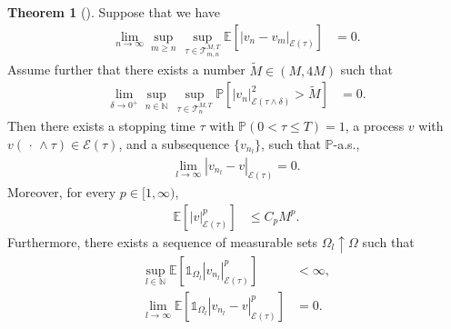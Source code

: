 \documentclass[11pt, reqno]{amsart}
\theoremstyle{definition}
\newtheorem{theorem}{Theorem}[section]
\numberwithin{equation}{section}
\newcommand{\bb}{\mathbb}
\newcommand{\abs}[1]{\left|{#1}\right|}
\newcommand{\one}{\mathds{1}}
\begin{document}
\begin{theorem}[\cite{GlaZia09, GlaTem11}]
Suppose that we have
\begin{align}
	\label{equ:cauchy 1}
	\lim_{n\to \infty} \sup_{m\geq n} \,\sup_{\tau \in \mathcal{T}_{m,n}^{M,T}} \bb{E}\left[ \abs{v_n-v_m}_{\mathcal{E}(\tau)} \right] &= 0.
\end{align}
Assume further that there exists a number $\widetilde{M}\in (M,4M)$ such that
\begin{align}
	\label{equ:cauchy 2}
	\lim_{\delta\to 0^+} \sup_{n\in \bb{N}} \,\sup_{\tau \in \mathcal{T}_{n}^{M,T}}
	\bb{P} \left[ \abs{v_n}_{\mathcal{E} (\tau \wedge \delta)}^2 > \widetilde{M} \right] &= 0.
\end{align}
Then there exists a stopping time $\tau$ with $\bb{P}(0<\tau\leq T)=1$, a process $v$ with $v(\,\cdot\,\wedge\tau) \in \mathcal{E}(\tau)$, and a subsequence $\{v_{n_l}\}$, such that $\bb{P}$-a.s.,
\begin{align}\label{equ:cauchy 3}
	\lim_{l\to\infty} \abs{v_{n_l}-v}_{\mathcal{E}(\tau)} = 0.
\end{align}
Moreover, for every $p\in [1,\infty)$,
\begin{align}\label{equ:cauchy 4}
	\bb{E}\left[ \abs{v}_{\mathcal{E}(\tau)}^p \right] &\leq C_p M^p.
\end{align}
Furthermore, there exists a sequence of measurable sets $\Omega_l \uparrow \Omega$ such that
\begin{align}\label{equ:cauchy 5}
	\sup_{l\in \bb{N}} \bb{E}\left[\one_{\Omega_l} \abs{v_{n_l}}_{\mathcal{E}(\tau)}^p \right] &< \infty,
	\\
	\label{equ:lim cauchy 6}
	\lim_{l\to\infty} \bb{E}\left[\one_{\Omega_l} \abs{v_{n_l}-v}_{\mathcal{E}(\tau)}^p \right] &= 0.
\end{align}
\end{theorem}
\end{document}
